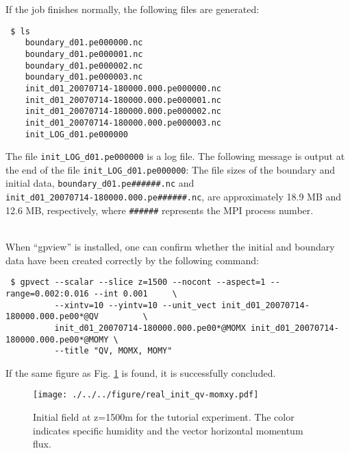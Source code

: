 If the job finishes normally, the following files are generated:
\begin{verbatim}
 $ ls
    boundary_d01.pe000000.nc
    boundary_d01.pe000001.nc
    boundary_d01.pe000002.nc
    boundary_d01.pe000003.nc
    init_d01_20070714-180000.000.pe000000.nc
    init_d01_20070714-180000.000.pe000001.nc
    init_d01_20070714-180000.000.pe000002.nc
    init_d01_20070714-180000.000.pe000003.nc
    init_LOG_d01.pe000000
\end{verbatim}
The file \verb|init_LOG_d01.pe000000| is a log file.  The following message is output at the end of the file \verb|init_LOG_d01.pe000000|:
The file sizes of the boundary and initial data, \verb|boundary_d01.pe######.nc| and \\
\verb|init_d01_20070714-180000.000.pe######.nc|, are approximately 18.9 MB and 12.6 MB, respectively,  where \verb|######| represents the MPI process number.

\vspace{1cm}
 \hrulefill \\
When ``gpview'' is installed,  one can confirm whether the initial and boundary data have been created correctly  by the following command:
\begin{verbatim}
 $ gpvect --scalar --slice z=1500 --nocont --aspect=1 --range=0.002:0.016 --int 0.001     \
          --xintv=10 --yintv=10 --unit_vect init_d01_20070714-180000.000.pe00*@QV         \
          init_d01_20070714-180000.000.pe00*@MOMX init_d01_20070714-180000.000.pe00*@MOMY \
          --title "QV, MOMX, MOMY"
\end{verbatim}
If the same figure as Fig. \ref{fig:init} is found, it is successfully concluded.

\begin{figure}[h]
\begin{center}
  \texttt{[image: ./../../figure/real\_init\_qv-momxy.pdf]}\\
  \caption{Initial field at z=1500m for the tutorial experiment.
    The color indicates specific humidity and the vector horizontal momentum flux.}
  \label{fig:init}
\end{center}
\end{figure}
